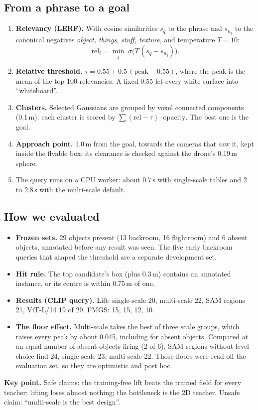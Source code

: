 \documentclass[11pt,a4paper]{article}
\newcommand{\keypt}[1]{\begin{key}\sffamily\small\textbf{Key point.} #1\end{key}}
\begin{document}
\subsection{From a phrase to a goal}\label{sec:query}
\begin{enumerate}
  \item \textbf{Relevancy (LERF).} With cosine similarities $s_q$ to the phrase and $s_{n_j}$ to the
    canonical negatives \emph{object, things, stuff, texture}, and temperature $T=10$:
    \[ \mathrm{rel}_i = \min_j \; \sigma\bigl(T\,(s_q - s_{n_j})\bigr). \]
  \item \textbf{Relative threshold.} $\tau = 0.55 + 0.5\,(\text{peak} - 0.55)$, where the peak is the mean
    of the top 100 relevancies. A fixed 0.55 let every white surface into ``whiteboard''.
  \item \textbf{Clusters.} Selected Gaussians are grouped by voxel connected components (0.1\,m); each
    cluster is scored by $\sum(\mathrm{rel}-\tau)\cdot\text{opacity}$. The best one is the goal.
  \item \textbf{Approach point.} 1.0\,m from the goal, towards the cameras that saw it, kept inside the
    flyable box; its clearance is checked against the drone's 0.19\,m sphere.
  \item The query runs on a CPU worker: about 0.7\,s with single-scale tables and 2 to 2.8\,s with the
    multi-scale default.
\end{enumerate}

\subsection{How we evaluated}\label{sec:eval}
\begin{itemize}
  \item \textbf{Frozen sets.} 29 objects present (13 backroom, 16 flightroom) and 6 absent objects,
    annotated before any result was seen. The five early backroom queries that shaped the threshold are a
    separate development set.
  \item \textbf{Hit rule.} The top candidate's box (plus 0.3\,m) contains an annotated instance, or its
    centre is within 0.75\,m of one.
  \item \textbf{Results (CLIP query).} Lift: single-scale 20, multi-scale 22, SAM regions 21, ViT-L/14 19
    of 29. FMGS: 15, 15, 12, 10.
  \item \textbf{The floor effect.} Multi-scale takes the best of three scale groups, which raises every
    peak by about 0.045, including for absent objects. Compared at an equal number of absent objects
    firing (2 of 6), SAM regions without level choice find 24, single-scale 23, multi-scale 22. Those floors
    were read off the evaluation set, so they are optimistic and post hoc.
\end{itemize}
\keypt{Safe claims: the training-free lift beats the trained field for every teacher; lifting loses almost
nothing; the bottleneck is the 2D teacher. Unsafe claim: ``multi-scale is the best design''.}
\end{document}
